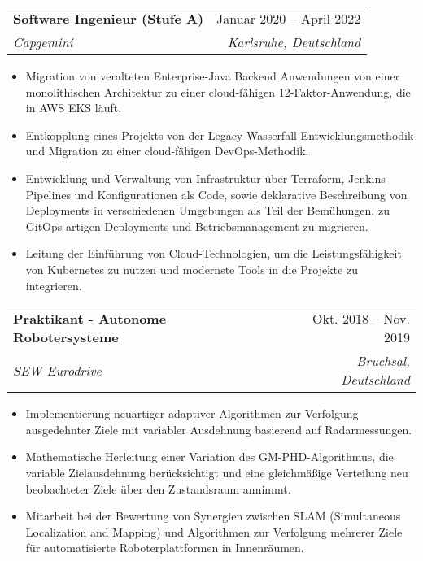 \documentclass[a4paper,12pt]{article}
\makeatletter
\newcommand{\resumeItem}[1]{
	\item\small{
		{#1 \vspace{-2pt}}
	}
}
\newcommand{\resumeSubheading}[4]{
	\vspace{-2pt}\item
	\begin{tabular*}{0.97\textwidth}[t]{l@{\extracolsep{\fill}}r}
		\textbf{#1} & #2 \\
		\textit{\small#3} & \textit{\small #4} \\
	\end{tabular*}\vspace{-7pt}
}
\newcommand{\resumeSubSubheading}[2]{
	\item
	\begin{tabular*}{0.97\textwidth}{l@{\extracolsep{\fill}}r}
		\textit{\small#1} & \textit{\small #2} \\
	\end{tabular*}\vspace{-7pt}
}
\newcommand{\resumeItemListStart}{\begin{itemize}}
\newcommand{\resumeItemListEnd}{\end{itemize}\vspace{-5pt}}
\makeatother
\begin{document}

\resumeSubheading{Software Ingenieur (Stufe A)}{Januar 2020 -- April 2022 }{Capgemini}{Karlsruhe, Deutschland}
\resumeItemListStart
	\resumeItem{Migration von veralteten Enterprise-Java Backend Anwendungen von einer monolithischen Architektur zu einer cloud-fähigen 12-Faktor-Anwendung, die in AWS EKS läuft.}
	\resumeItem{Entkopplung eines Projekts von der Legacy-Wasserfall-Entwicklungsmethodik und Migration zu einer cloud-fähigen DevOps-Methodik.}
	\resumeItem{Entwicklung und Verwaltung von Infrastruktur über Terraform, Jenkins-Pipelines und Konfigurationen als Code, sowie deklarative Beschreibung von Deployments in verschiedenen Umgebungen als Teil der Bemühungen, zu GitOps-artigen Deployments und Betriebsmanagement zu migrieren.}
	\resumeItem{Leitung der Einführung von Cloud-Technologien, um die Leistungsfähigkeit von Kubernetes zu nutzen und modernste Tools in die Projekte zu integrieren.}
\resumeItemListEnd

\resumeSubheading
{Praktikant - Autonome Robotersysteme}{Okt. 2018 -- Nov. 2019}
{SEW Eurodrive}{Bruchsal, Deutschland}
\resumeItemListStart
\resumeItem{Implementierung neuartiger adaptiver Algorithmen zur Verfolgung ausgedehnter Ziele mit variabler Ausdehnung basierend auf Radarmessungen.}
\resumeItem{Mathematische Herleitung einer Variation des GM-PHD-Algorithmus, die variable Zielausdehnung berücksichtigt und eine gleichmäßige Verteilung neu beobachteter Ziele über den Zustandsraum annimmt.}
\resumeItem{Mitarbeit bei der Bewertung von Synergien zwischen SLAM (Simultaneous Localization and Mapping) und Algorithmen zur Verfolgung mehrerer Ziele für automatisierte Roboterplattformen in Innenräumen.}
\resumeItemListEnd
\end{document}
